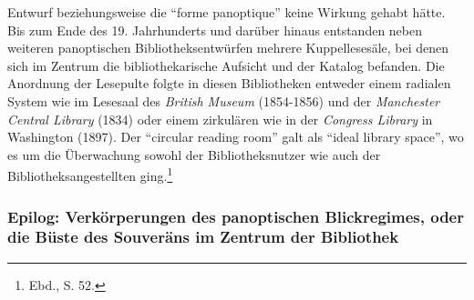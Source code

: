 Entwurf beziehungsweise die \enquote{forme panoptique} keine Wirkung
gehabt hätte. Bis zum Ende des 19. Jahrhunderts und darüber hinaus
entstanden neben weiteren panoptischen Bibliotheksentwürfen mehrere
Kuppellesesäle, bei denen sich im Zentrum die bibliothekarische Aufsicht
und der Katalog befanden. Die Anordnung der Lesepulte folgte in diesen
Bibliotheken entweder einem radialen System wie im Lesesaal des
\emph{British Museum} (1854-1856) und der \emph{Manchester Central
Library} (1834) oder einem zirkulären wie in der \emph{Congress Library}
in Washington (1897). Der \enquote{circular reading room} galt als
\enquote{ideal library space}, wo es um die Überwachung sowohl der
Bibliotheksnutzer wie auch der Bibliotheksangestellten ging.\footnote{Ebd.,
  S. 52.}

\subsubsection{Epilog: Verkörperungen des panoptischen Blickregimes,
oder die Büste des Souveräns im Zentrum der
Bibliothek}\label{epilog-verkuxf6rperungen-des-panoptischen-blickregimes-oder-die-buxfcste-des-souveruxe4ns-im-zentrum-der-bibliothek}

